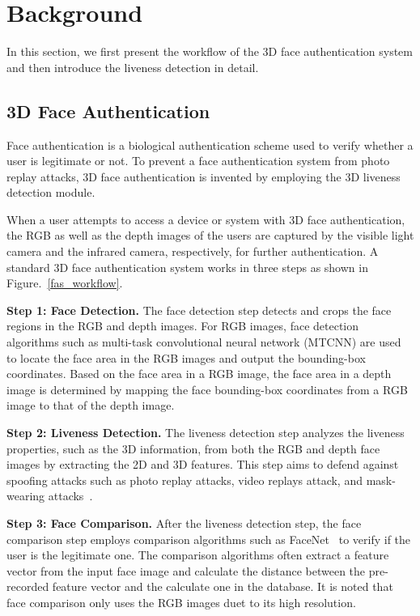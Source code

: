 \section{Background}
\label{sec:background}
In this section, we first present the workflow of the 3D face authentication system and then introduce the liveness detection in detail.

\subsection{3D Face Authentication}
Face authentication is a biological authentication scheme used to verify whether a user is legitimate or not. To prevent a face authentication system from photo replay attacks, 3D face authentication is invented by employing the 3D liveness detection module. 

When a user attempts to access a device or system with 3D face authentication, the RGB as well as the depth images of the users are captured by the visible light camera and the infrared camera, respectively, for further authentication. A standard 3D face authentication system works in three steps as shown in Figure.~\ref{fas_workflow}.

\textbf{Step 1: Face Detection.} 
The face detection step detects and crops the face regions in the RGB and depth images. For RGB images, face detection algorithms such as multi-task convolutional neural network (MTCNN) \cite{zhang2016joint} are used to locate the face area in the RGB images and output the bounding-box coordinates. Based on the face area in a RGB image, the face area in a depth image is determined by mapping the face bounding-box coordinates from a RGB image to that of the depth image.

\textbf{Step 2: Liveness Detection.} The liveness detection step analyzes the liveness properties, such as the 3D information, from both the RGB and depth face images by extracting the 2D and 3D features. 
This step aims to defend against spoofing attacks such as photo replay attacks, video replays attack, and mask-wearing attacks~\cite{chakka2011competition,anjos2011counter,raghavendra2015presentation, bhattacharjee2018spoofing, nesli2013spoofing}.

\textbf{Step 3: Face Comparison.} After the liveness detection step, the face comparison step employs comparison algorithms such as FaceNet~\cite{schroff2015facenet} to verify if the user is the legitimate one. The comparison algorithms often extract a feature vector from the input face image and calculate the distance between the pre-recorded feature vector and the calculate one in the database. It is noted that face comparison only uses the RGB images duet to its high resolution.

